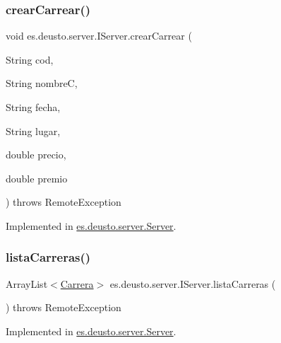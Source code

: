 \mbox{\label{interfacees_1_1deusto_1_1server_1_1_i_server_a3cb0049dde89f2d81fcc883b19a0c6cf}} 
\subsubsection{\texorpdfstring{crearCarrear()}{crearCarrear()}}
{\footnotesize\ttfamily void es.\+deusto.\+server.\+I\+Server.\+crear\+Carrear (\begin{DoxyParamCaption}\item[{String}]{cod,  }\item[{String}]{nombreC,  }\item[{String}]{fecha,  }\item[{String}]{lugar,  }\item[{double}]{precio,  }\item[{double}]{premio }\end{DoxyParamCaption}) throws Remote\+Exception}



Implemented in \mbox{\hyperlink{classes_1_1deusto_1_1server_1_1_server_a22d31cd9642f978f1995fc7822d99258}{es.\+deusto.\+server.\+Server}}.

\mbox{\label{interfacees_1_1deusto_1_1server_1_1_i_server_a13c17b07c8114d16130053aecdd455bb}} 
\subsubsection{\texorpdfstring{listaCarreras()}{listaCarreras()}}
{\footnotesize\ttfamily Array\+List$<$\mbox{\hyperlink{classes_1_1deusto_1_1server_1_1jdo_1_1_carrera}{Carrera}}$>$ es.\+deusto.\+server.\+I\+Server.\+lista\+Carreras (\begin{DoxyParamCaption}{ }\end{DoxyParamCaption}) throws Remote\+Exception}



Implemented in \mbox{\hyperlink{classes_1_1deusto_1_1server_1_1_server_af62ce3462ec30a081db0009d2f2b33bb}{es.\+deusto.\+server.\+Server}}.

